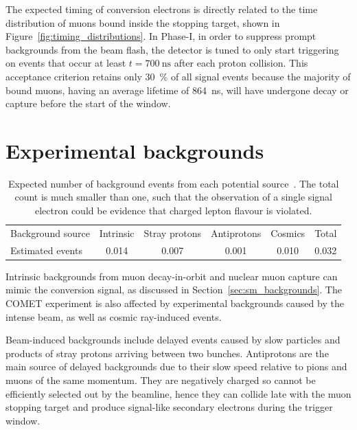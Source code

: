 The expected timing of conversion electrons is directly related to the time
distribution of muons bound inside the stopping target, shown in
Figure~\ref{fig:timing_distributions}. In Phase-I, in order to suppress prompt
backgrounds from the beam flash, the detector is tuned to only start triggering
on events that occur at least $t=\SI{700}{\ns}$ after each proton collision.
This acceptance criterion retains only \SI{30}{\percent} of all signal events
because the majority of bound muons, having an average lifetime of \SI{864}{\ns},
will have undergone decay or capture before the start of the window.


\section{Experimental backgrounds}\label{sec:backgrounds}

\begin{table}
    \centering
    \begin{tabular}{l|cccc|c}
        \toprule
        Background source & Intrinsic & Stray protons & Antiprotons &
        Cosmics  & Total\\ 
        Estimated events & 0.014 & 0.007 & 0.001 & 0.010 & 0.032 \\ \bottomrule
    \end{tabular}
    \caption{Expected number of background events from each potential
    source~\cite{the_comet_collaboration_comet_2020}. The total count is much
    smaller than one, such that the observation of a single signal electron
    could be evidence that charged lepton flavour is violated.}
    \label{tab:backgrounds}
\end{table}

Intrinsic backgrounds from muon decay-in-orbit and nuclear muon capture can
mimic the conversion signal, as discussed in Section~\ref{sec:sm_backgrounds}.
The COMET experiment is also affected by experimental backgrounds caused by the
intense beam, as well as cosmic ray-induced events.

Beam-induced backgrounds include delayed events caused by slow particles and
products of stray protons arriving between two bunches.
Antiprotons are the main source of delayed backgrounds due to their slow
speed relative to pions and muons of the same momentum. They are negatively
charged so cannot be efficiently selected out by the beamline, hence they can
collide late with the muon stopping target and produce signal-like secondary
electrons during the trigger window.

